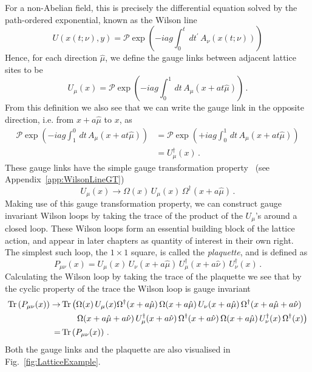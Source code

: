For a non-Abelian field, this is precisely the differential equation solved by the path-ordered exponential, known as the Wilson line
%
\begin{equation}
U(x(t;\nu),y) = \mathcal{P}\exp\left(-iag\int_0^t \,dt^\prime \,A_\nu(x(t;\nu))\right)
\end{equation}
%
Hence, for each direction $\hat{\mu}$, we define the gauge links between adjacent lattice sites to be
%
\begin{equation}
U_\mu(x) = \mathcal{P}\exp\left(-iag\int_0^1 \,dt \,A_\mu(x + at\hat{\mu})\right)\, .
\label{eq:GaugeLink}
\end{equation}
%
From this definition we also see that we can write the gauge link in the opposite direction, i.e. from $x+a\hat{\mu}$ to $x$, as
%
\begin{align*}
\mathcal{P}\exp\left(-iag\int^0_1 \,dt\,A_\mu(x + at\hat{\mu})\right) &= \mathcal{P}\exp\left(+iag\int_0^1 \,dt\,A_\mu(x + at\hat{\mu})\right)\\
&=U^\dag_\mu(x)\, .
\end{align*}
%
These gauge links have the simple gauge transformation property~\cite{Lepage:1998dt} (see Appendix~\ref{app:WilsonLineGT})
%
\begin{equation}
U_\mu(x)\rightarrow \Omega(x)\,U_\mu(x)\,\Omega^\dag(x+a\hat{\mu})\, .
\label{eq:LinkTransformation}
\end{equation}
%
Making use of this gauge transformation property, we can construct gauge invariant Wilson loops by taking the trace of the product of the $U_\mu$'s around a closed loop. These Wilson loops form an essential building block of the lattice action, and  appear in later chapters as quantity of interest in their own right. The simplest such loop, the $1\times 1$ square, is called the \textit{plaquette}, and is defined as
\begin{equation}
P_{\mu\nu}(x) = U_\mu(x)\,U_\nu(x+a\hat{\mu})\, U_\mu^\dag(x+a\hat{\nu})\, U_\nu^\dag(x)\, .
\label{eq:Plaquette}
\end{equation}
Calculating the Wilson loop by taking the trace of the plaquette we see that by the cyclic property of the trace the Wilson loop is gauge invariant
\begin{align*}
\operatorname{Tr}\left(P_{\mu\nu}(x)\right)\rightarrow& \operatorname{Tr} \left(\Omega(x)\,U_\mu(x)\Omega^\dag(x+a\hat{\mu})\,\Omega(x+a\hat{\mu})\,U_\nu(x+a\hat{\mu})\,\Omega^\dag(x+a\hat{\mu}+a\hat{\nu})\right.\\
&~~~~~\left.\Omega(x+a\hat{\mu}+a\hat{\nu})\,U_\mu^\dag(x+a\hat{\nu})\,\Omega^\dag(x+a\hat{\nu})\,\Omega(x+a\hat{\mu})\, U_\nu^\dag(x)\,\Omega^\dag(x)\right)\\
=&\operatorname{Tr}\left(P_{\mu\nu}(x)\right)\, .
\end{align*}
Both the gauge links and the plaquette are also visualised in Fig.~\ref{fig:LatticeExample}.\\

